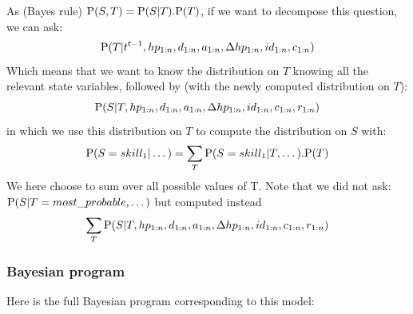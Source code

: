 As (Bayes rule) $\mathrm{P}(S,T) = \mathrm{P}(S|T).\mathrm{P}(T)$, if we want to decompose this question, we can ask:
$$\mathrm{P}(T | t^{t-1}, hp_{1:n},d_{1:n}, a_{1:n}, \Delta hp_{1:n}, id_{1:n}, c_{1:n})$$ 
Which means that we want to know the distribution on $T$ knowing all the relevant state variables, followed by (with the newly computed distribution on $T$):
$$\mathrm{P}(S | T, hp_{1:n},d_{1:n}, a_{1:n}, \Delta hp_{1:n}, id_{1:n}, c_{1:n}, r_{1:n})$$ 
in which we use this distribution on $T$ to compute the distribution on $S$ with:
$$\mathrm{P}(S=skill_1 | \dots) = \sum_T \mathrm{P}(S=skill_1 | T, \dots).\mathrm{P}(T)$$
We here choose to sum over all possible values of T. Note that we did not ask:\\
$\mathrm{P}(S|T=most\_probable , \dots)$ but computed instead
$$\sum_T \mathrm{P}(S|T,hp_{1:n},d_{1:n}, a_{1:n}, \Delta hp_{1:n}, id_{1:n}, c_{1:n}, r_{1:n})$$


\subsubsection{Bayesian program}
Here is the full Bayesian program corresponding to this model:


